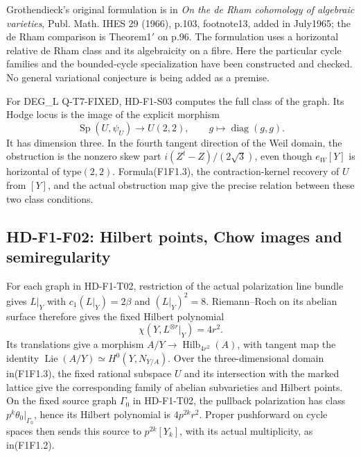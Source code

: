 Grothendieck's original formulation is in \emph{On the de Rham
cohomology of algebraic varieties}, Publ. Math. IHES 29 (1966),
p.103, footnote13, added in July1965; the de Rham comparison is
Theorem1$'$ on p.96. The formulation uses a horizontal relative
de Rham class and its algebraicity on a fibre. Here the particular
cycle families and the bounded-cycle specialization have been
constructed and checked. No general variational conjecture is
being added as a premise.

For DEG\_L Q-T7-FIXED, HD-F1-S03 computes the full class of the
graph. Its Hodge locus is the image of the explicit morphism
\[
 \operatorname{Sp}(U,\psi_U)\longrightarrow U(2,2),
                     \qquad g\longmapsto\operatorname{diag}(g,g).
 \tag{F1F1.3}
\]
It has dimension three. In the fourth tangent direction of the
Weil domain, the obstruction is the nonzero skew part
$i(Z^t-Z)/(2\sqrt3)$, even though $e_W[Y]$ is horizontal of
type$(2,2)$. Formula(F1F1.3), the contraction-kernel recovery of
$U$ from $[Y]$, and the actual obstruction map give the precise
relation between these two class conditions.

\subsection{HD-F1-F02: Hilbert points, Chow images and semiregularity}

For each graph in HD-F1-T02, restriction of the actual polarization
line bundle gives $L|_Y$ with $c_1(L|_Y)=2\beta$ and
$(L|_Y)^2=8$. Riemann--Roch on its abelian surface therefore gives
the fixed Hilbert polynomial
\[
 \chi(Y,L^{\otimes r}|_Y)=4r^2.
 \tag{F1F2.1}
\]
Its translations give a morphism $A/Y\to\operatorname{Hilb}_{4r^2}(A)$,
with tangent map the identity
$\operatorname{Lie}(A/Y)\simeq H^0(Y,N_{Y/A})$.
Over the three-dimensional domain in(F1F1.3), the fixed rational
subspace $U$ and its intersection with the marked lattice give
the corresponding family of abelian subvarieties and Hilbert points.
On the fixed source graph $\Gamma_0$ in HD-F1-T02, the pullback
polarization has class $p^k\theta_0|_{\Gamma_0}$, hence its Hilbert
polynomial is $4p^{2k}r^2$. Proper pushforward on cycle spaces
then sends this source to $p^{2k}[Y_k]$, with its actual
multiplicity, as in(F1F1.2).


